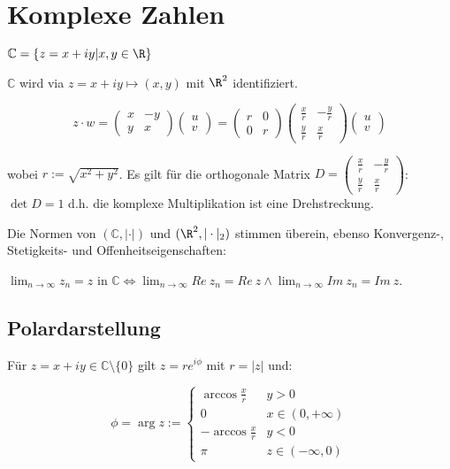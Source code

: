 \newcommand{\C}{\mathbb{C}}

\section*{Komplexe Zahlen}

$\C = \{ z = x+iy | x,y \in \R \}$

$\C$ wird via $z = x + iy \mapsto (x,y)$ mit $\R^2$ identifiziert.

\vspace*{-4mm}
$$z \cdot w = \begin{pmatrix} x & -y \\ y & x\end{pmatrix} \begin{pmatrix} u \\ v\end{pmatrix} = \begin{pmatrix} r & 0 \\ 0 & r\end{pmatrix} \begin{pmatrix} \frac{x}{r} & -\frac{y}{r} \\ \frac{y}{r} & \frac{x}{r}\end{pmatrix} \begin{pmatrix} u \\ v\end{pmatrix}$$

wobei $r := \sqrt{x^2 + y^2}$. Es gilt für die orthogonale Matrix $D = \begin{pmatrix} \frac{x}{r} & -\frac{y}{r} \\ \frac{y}{r} & \frac{x}{r}\end{pmatrix}$: $\det D = 1$ d.h. die komplexe Multiplikation ist eine Drehstreckung.

Die Normen von $(\C,|\cdot|)$ und $(\R^2,|\cdot|_2)$ stimmen überein, ebenso Konvergenz-, Stetigkeits- und Offenheitseigenschaften:

$\lim_{n \to \infty} z_n = z$ in $\C \iff \lim_{n \to \infty} Re \ z_n = Re \ z \land \lim_{n \to \infty} Im \ z_n = Im \ z$.

\subsection*{Polardarstellung}

Für $z = x +iy \in \C \setminus \{0\}$ gilt $z = re^{i\phi}$ mit $r = |z|$ und:

\vspace*{-2mm}
$$\phi = \arg z := \begin{cases}
	\arccos \frac{x}{r} & y > 0 \\
	0 & x \in (0,+\infty) \\
	-\arccos \frac{x}{r} & y < 0 \\
	\pi & z \in (-\infty,0)
\end{cases}$$

